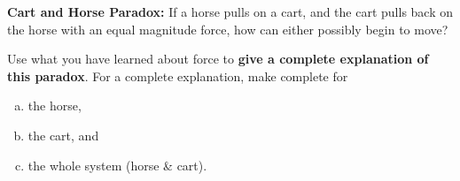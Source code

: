 \label{fnt8.1.1-1}

\textbf{Cart and Horse Paradox:} If a horse pulls on a cart, and the cart pulls back on the horse with an equal magnitude force, how can either possibly begin to move?

Use what you have learned about force to \textbf{give a complete explanation of this paradox}. For a complete explanation, make complete \forcediags{} for 
\begin{enumerate}[(a)]
	\item the horse, 
	\item the cart, and 
	\item the whole system (horse \& cart).
\end{enumerate}